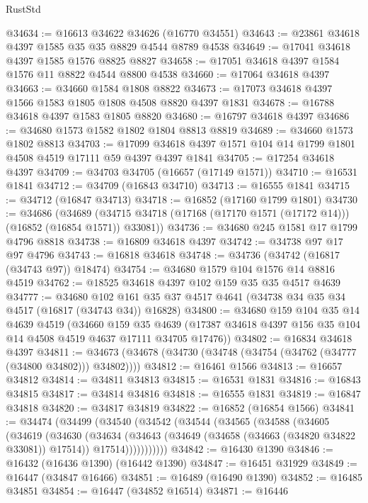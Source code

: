 \begin{lexlean}{RustStd}
\begin{coremodule}
@34634 := @16613 @34622 @34626 (@16770 @34551)
@34643 := @23861 @34618 @4397 @1585 @35 @35 @8829 @4544 @8789 @4538
@34649 := @17041 @34618 @4397 @1585 @1576 @8825 @8827
@34658 := @17051 @34618 @4397 @1584 @1576 @11 @8822 @4544 @8800 @4538
@34660 := @17064 @34618 @4397
@34663 := @34660 @1584 @1808 @8822
@34673 := @17073 @34618 @4397 @1566 @1583 @1805 @1808 @4508 @8820 @4397 @1831
@34678 := @16788 @34618 @4397 @1583 @1805 @8820
@34680 := @16797 @34618 @4397
@34686 := @34680 @1573 @1582 @1802 @1804 @8813 @8819
@34689 := @34660 @1573 @1802 @8813
@34703 := @17099 @34618 @4397 @1571 @104 @14 @1799 @1801 @4508 @4519 @17111 @59 @4397 @4397 @1841
@34705 := @17254 @34618 @4397
@34709 := @34703 @34705 (@16657 (@17149 @1571))
@34710 := @16531 @1841
@34712 := @34709 (@16843 @34710)
@34713 := @16555 @1841
@34715 := @34712 (@16847 @34713)
@34718 := @16852 (@17160 @1799 @1801)
@34730 := @34686
    (@34689 (@34715 @34718 (@17168 (@17170 @1571 (@17172 @14))) (@16852 (@16854 @1571)) @33081))
@34736 := @34680 @245 @1581 @17 @1799 @4796 @8818
@34738 := @16809 @34618 @4397
@34742 := @34738 @97 @17 @97 @4796
@34743 := @16818 @34618
@34748 := @34736 (@34742 (@16817 (@34743 @97)) @18474)
@34754 := @34680 @1579 @104 @1576 @14 @8816 @4519
@34762 := @18525 @34618 @4397 @102 @159 @35 @35 @4517 @4639
@34777 := @34680
    @102
    @161
    @35
    @37
    @4517
    @4641
    (@34738 @34 @35 @34 @4517 (@16817 (@34743 @34)) @16828)
@34800 := @34680
    @159
    @104
    @35
    @14
    @4639
    @4519
    (@34660
      @159
      @35
      @4639
      (@17387 @34618 @4397 @156 @35 @104 @14 @4508 @4519 @4637 @17111 @34705 @17476))
@34802 := @16834 @34618 @4397
@34811 := @34673 (@34678 (@34730 (@34748 (@34754 (@34762 (@34777 (@34800 @34802))) @34802))))
@34812 := @16461 @1566
@34813 := @16657 @34812
@34814 := @34811 @34813
@34815 := @16531 @1831
@34816 := @16843 @34815
@34817 := @34814 @34816
@34818 := @16555 @1831
@34819 := @16847 @34818
@34820 := @34817 @34819
@34822 := @16852 (@16854 @1566)
@34841 := @34474
    (@34499
      (@34540
        (@34542
          (@34544
            (@34565
              (@34588
                (@34605
                  (@34619
                    (@34630
                      (@34634
                        (@34643
                          (@34649 (@34658 (@34663 (@34820 @34822 @33081)) @17514))
                          @17514)))))))))))
@34842 := @16430 @1390
@34846 := @16432 (@16436 @1390) (@16442 @1390)
@34847 := @16451 @31929
@34849 := @16447 (@34847 @16466)
@34851 := @16489 (@16490 @1390)
@34852 := @16485 @34851
@34854 := @16447 (@34852 @16514)
@34871 := @16446

\end{coremodule}
\end{lexlean}
